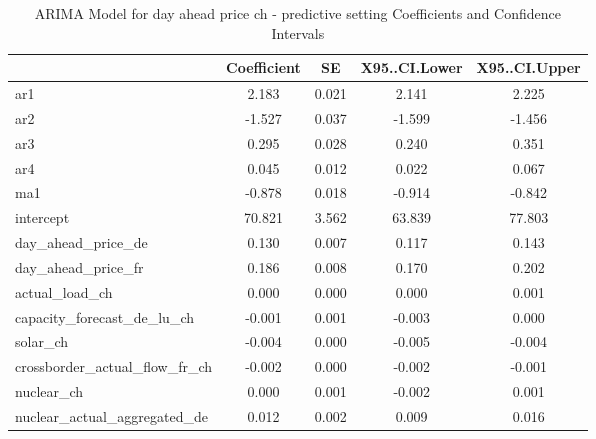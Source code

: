 \begin{table}

\caption{ARIMA Model for day ahead price ch - predictive setting Coefficients and Confidence Intervals}
\centering
\begin{tabular}[t]{l|c|c|c|c}
\hline
  & Coefficient & SE & X95..CI.Lower & X95..CI.Upper\\
\hline
ar1 & 2.183 & 0.021 & 2.141 & 2.225\\
\hline
ar2 & -1.527 & 0.037 & -1.599 & -1.456\\
\hline
ar3 & 0.295 & 0.028 & 0.240 & 0.351\\
\hline
ar4 & 0.045 & 0.012 & 0.022 & 0.067\\
\hline
ma1 & -0.878 & 0.018 & -0.914 & -0.842\\
\hline
intercept & 70.821 & 3.562 & 63.839 & 77.803\\
\hline
day\_ahead\_price\_de & 0.130 & 0.007 & 0.117 & 0.143\\
\hline
day\_ahead\_price\_fr & 0.186 & 0.008 & 0.170 & 0.202\\
\hline
actual\_load\_ch & 0.000 & 0.000 & 0.000 & 0.001\\
\hline
capacity\_forecast\_de\_lu\_ch & -0.001 & 0.001 & -0.003 & 0.000\\
\hline
solar\_ch & -0.004 & 0.000 & -0.005 & -0.004\\
\hline
crossborder\_actual\_flow\_fr\_ch & -0.002 & 0.000 & -0.002 & -0.001\\
\hline
nuclear\_ch & 0.000 & 0.001 & -0.002 & 0.001\\
\hline
nuclear\_actual\_aggregated\_de & 0.012 & 0.002 & 0.009 & 0.016\\
\hline
\end{tabular}
\end{table}\begin{table}


\end{table}
